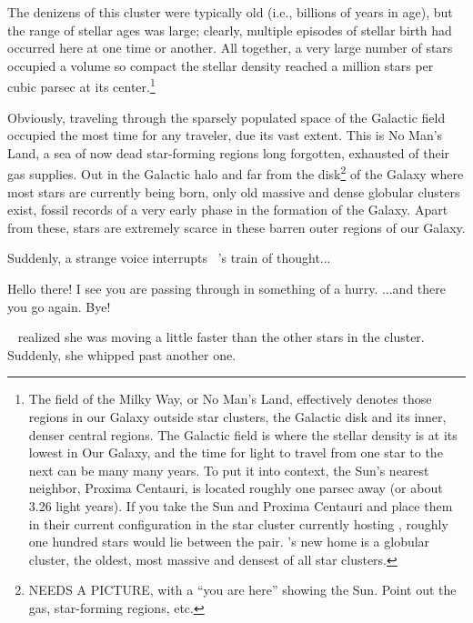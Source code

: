 \documentclass[main.tex]{subfiles}
\begin{document}
\par \nar The denizens of this cluster were typically old (i.e., billions of years in age), but the range of stellar ages was large; clearly, multiple episodes of stellar birth had occurred here at one time or another.  All together, a very large number of stars occupied a volume so compact the stellar density reached a million stars per cubic parsec at its center.\footnote{The field of the Milky Way, or No Man's Land, effectively denotes those regions in our Galaxy outside star clusters, the Galactic disk and its inner, denser central regions.  The Galactic field is where the stellar density is at its lowest in Our Galaxy, and the time for light to travel from one star to the next can be many many years. To put it into context, the Sun's nearest neighbor, Proxima Centauri, is located roughly one parsec away (or about 3.26 light years).  If you take the Sun and Proxima Centauri and place them in their current configuration in the star cluster currently hosting \rmsterope, roughly one hundred stars would lie between the pair.  \rmsterope's new home is a globular cluster, the oldest, most massive and densest of all star clusters.} 

\par \nar Obviously, traveling through the sparsely populated space of the Galactic field occupied the most time for any traveler, due its vast extent.  This is No Man's Land, a sea of now dead star-forming regions long forgotten, exhausted of their gas supplies.  Out in the Galactic halo and far from the disk\footnote{NEEDS A PICTURE, with a ``you are here'' showing the Sun. Point out the gas, star-forming regions, etc.} of the Galaxy where most stars are currently being born, only old massive and dense globular clusters exist, fossil records of a very early phase in the formation of the Galaxy.  Apart from these, stars are extremely scarce in these barren outer regions of our Galaxy. 


\par \nar Suddenly, a strange voice interrupts \rmsterope~'s train of thought...

\par \Jane Hello there!  I see you are passing through in something of a hurry.  ...and there you go again.  Bye!

\par \nar \rmsterope~ realized she was moving a little faster than the other stars in the cluster.  Suddenly, she whipped past another one.
\end{document}
